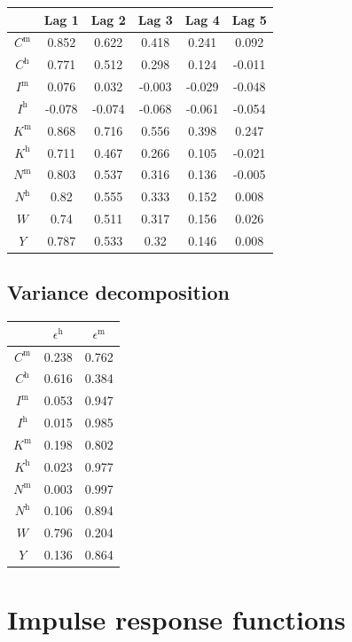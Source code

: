 \begin{tabular}{c|ccccc|}
  & Lag 1 & Lag 2 & Lag 3 & Lag 4 & Lag 5\\
\hline
$C^{\mathrm{m}}$ & 0.852 & 0.622 & 0.418 & 0.241 & 0.092 \\
$C^{\mathrm{h}}$ & 0.771 & 0.512 & 0.298 & 0.124 & -0.011 \\
$I^{\mathrm{m}}$ & 0.076 & 0.032 & -0.003 & -0.029 & -0.048 \\
$I^{\mathrm{h}}$ & -0.078 & -0.074 & -0.068 & -0.061 & -0.054 \\
$K^{\mathrm{m}}$ & 0.868 & 0.716 & 0.556 & 0.398 & 0.247 \\
$K^{\mathrm{h}}$ & 0.711 & 0.467 & 0.266 & 0.105 & -0.021 \\
$N^{\mathrm{m}}$ & 0.803 & 0.537 & 0.316 & 0.136 & -0.005 \\
$N^{\mathrm{h}}$ & 0.82 & 0.555 & 0.333 & 0.152 & 0.008 \\
$W$ & 0.74 & 0.511 & 0.317 & 0.156 & 0.026 \\
$Y$ & 0.787 & 0.533 & 0.32 & 0.146 & 0.008 \\
\hline
\end{tabular}


\subsection{Variance decomposition}

\begin{tabular}{c|cc|}
  & $\epsilon^{\mathrm{h}}$ & $\epsilon^{\mathrm{m}}$\\
\hline
$C^{\mathrm{m}}$ & 0.238 & 0.762 \\
$C^{\mathrm{h}}$ & 0.616 & 0.384 \\
$I^{\mathrm{m}}$ & 0.053 & 0.947 \\
$I^{\mathrm{h}}$ & 0.015 & 0.985 \\
$K^{\mathrm{m}}$ & 0.198 & 0.802 \\
$K^{\mathrm{h}}$ & 0.023 & 0.977 \\
$N^{\mathrm{m}}$ & 0.003 & 0.997 \\
$N^{\mathrm{h}}$ & 0.106 & 0.894 \\
$W$ & 0.796 & 0.204 \\
$Y$ & 0.136 & 0.864 \\
\hline
\end{tabular}



\pagebreak

\section{Impulse response functions}


